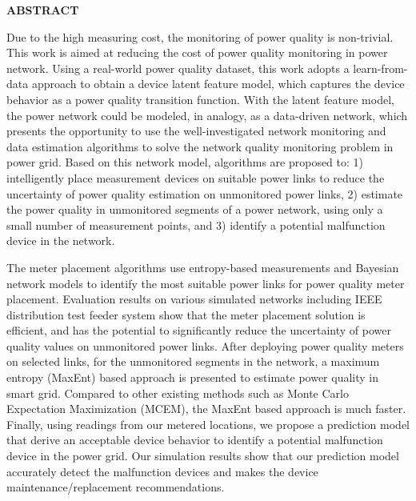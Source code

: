 \newpage
{}


\begin{center}
\textbf{ABSTRACT}
\end{center}

Due to the high measuring cost, the monitoring of power quality is non-trivial. This work is aimed at reducing the cost of power quality monitoring in power network. Using a real-world power quality dataset, this work adopts a learn-from-data approach to obtain a device latent feature model, which captures the device behavior as a power quality transition function. With the latent feature model, the power network could be modeled, in analogy, as a data-driven network, which presents the opportunity to use the well-investigated network monitoring and data estimation algorithms to solve the network quality monitoring problem in power grid. Based on this network model, algorithms are proposed to: 1) intelligently place measurement devices on suitable power links to reduce the uncertainty of power quality estimation on unmonitored power links, 2) estimate the power quality in unmonitored segments of a power network, using only a small number of measurement points, and 3) identify a potential malfunction device in the network.

The meter placement algorithms use entropy-based measurements and Bayesian network models to identify the most suitable power links for power quality meter placement. Evaluation results on various simulated networks including IEEE distribution test feeder system show that the meter placement solution is efficient, and has the potential to significantly reduce the uncertainty of power quality values on unmonitored power links. After deploying power quality meters on selected links, for the unmonitored segments in the network, a maximum entropy (MaxEnt) based approach is presented to estimate power quality in smart grid. Compared to other existing methods such as Monte Carlo Expectation Maximization (MCEM), the MaxEnt based approach is much faster. Finally, using readings from our metered locations, we propose a prediction model that derive an acceptable device behavior to identify a potential malfunction device in the power grid. Our simulation results show that our prediction model accurately detect the malfunction devices and makes the device maintenance/replacement recommendations.